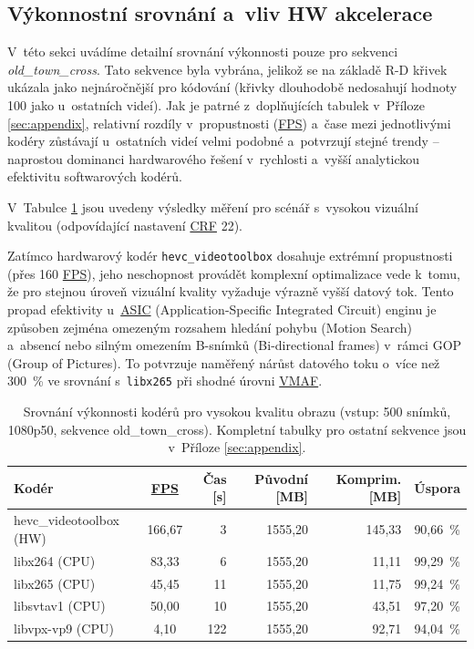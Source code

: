 \documentclass[11pt,a4paper]{article}
\begin{document}
\subsection*{Výkonnostní srovnání a~vliv HW akcelerace}
V~této sekci uvádíme detailní srovnání výkonnosti pouze pro sekvenci \textit{old\_town\_cross}. Tato sekvence byla vybrána, jelikož se na základě R-D křivek ukázala jako nejnáročnější pro kódování (křivky dlouhodobě nedosahují hodnoty 100 jako u~ostatních videí). Jak je patrné z~doplňujících tabulek v~Příloze \ref{sec:appendix}, relativní rozdíly v~propustnosti (\hyperref[sec:derived_metrics]{FPS}) a~čase mezi jednotlivými kodéry zůstávají u~ostatních videí velmi podobné a~potvrzují stejné trendy – naprostou dominanci hardwarového řešení v~rychlosti a~vyšší analytickou efektivitu softwarových kodérů.

V~Tabulce \ref{tab:times} jsou uvedeny výsledky měření pro scénář s~vysokou vizuální kvalitou (odpovídající nastavení \hyperref[sec:glossary]{CRF} 22).

Zatímco hardwarový kodér \texttt{hevc\_videotoolbox} dosahuje extrémní propustnosti (přes 160 \hyperref[sec:derived_metrics]{FPS}), jeho neschopnost provádět komplexní optimalizace vede k~tomu, že pro stejnou úroveň vizuální kvality vyžaduje výrazně vyšší datový tok. Tento propad efektivity u~\hyperref[sec:glossary]{ASIC} (Application-Specific Integrated Circuit) enginu je způsoben zejména omezeným rozsahem hledání pohybu (Motion Search) a~absencí nebo silným omezením B-snímků (Bi-directional frames) v~rámci GOP (Group of Pictures). To potvrzuje naměřený nárůst datového toku o~více než 300\ \% ve srovnání s~\texttt{libx265} při shodné úrovni \hyperref[sec:metrics]{VMAF}.

\begin{table}[H]
\centering
\caption{Srovnání výkonnosti kodérů pro vysokou kvalitu obrazu (vstup: 500 snímků, 1080p50, sekvence old\_town\_cross). Kompletní tabulky pro ostatní sekvence jsou v~Příloze \ref{sec:appendix}.}
\label{tab:times}
\begin{tabular}{|l|c|r|r|r|c|}
\hline
\textbf{Kodér} & \textbf{\hyperref[sec:derived_metrics]{FPS}} & \textbf{Čas [s]} & \textbf{Původní [MB]} & \textbf{Komprim. [MB]} & \textbf{Úspora} \\
\hline
hevc\_videotoolbox (HW) & 166,67 & 3 & 1555,20 & 145,33 & 90,66\ \% \\
libx264 (CPU) & 83,33 & 6 & 1555,20 & 11,11 & 99,29\ \% \\
libx265 (CPU) & 45,45 & 11 & 1555,20 & 11,75 & 99,24\ \% \\
libsvtav1 (CPU) & 50,00 & 10 & 1555,20 & 43,51 & 97,20\ \% \\
libvpx-vp9 (CPU) & 4,10 & 122 & 1555,20 & 92,71 & 94,04\ \% \\
\hline
\end{tabular}
\end{table}
\end{document}
